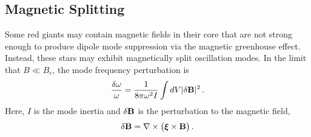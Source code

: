 \subsection{Magnetic Splitting}

Some red giants may contain magnetic fields in their core that are not strong enough to produce dipole mode suppression via the magnetic greenhouse effect. Instead, these stars may exhibit magnetically split oscillation modes. In the limit that $B \ll B_c$, the mode frequency perturbation is \citep{Unno_1989}
\begin{equation}
\label{eqn:dommag}
\frac{\delta \omega}{\omega} = \frac{1}{8 \pi \omega^2 I} \int d V | \delta {\bf B} |^2 \, .
\end{equation}
Here, $I$ is the mode inertia and  $\delta {\bf B}$ is the perturbation to the magnetic field,
\begin{equation}
\label{eqn:dB}
\delta {\bf B} = {\bf \nabla} \times \big( {\mbox{\boldmath $\xi$}} \times {\bf B} \big) \, .
\end{equation}